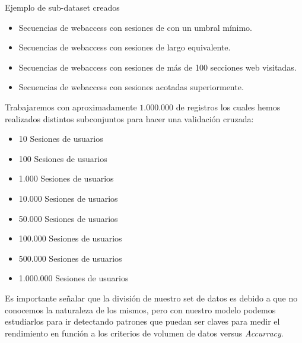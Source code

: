 Ejemplo de sub-dataset creados
\begin{itemize}
	\setlength{\itemsep}{0.9pt}
	\setlength{\parskip}{0pt}
	\setlength{\parsep}{0pt}
	\item Secuencias de webaccess con sesiones de con un umbral mínimo.
	\item Secuencias de webaccess con sesiones de largo equivalente.
	\item Secuencias de webaccess con sesiones de más de 100 secciones web visitadas.
	\item Secuencias de webaccess con sesiones acotadas superiormente.
\end{itemize}


Trabajaremos con aproximadamente $1.000.000$ de registros los cuales hemos realizados distintos subconjuntos para hacer una validación cruzada:

\begin{itemize}
	\setlength{\itemsep}{1pt}
	\setlength{\parskip}{0pt}
	\setlength{\parsep}{0pt}
	\item 10 Sesiones de usuarios
	\item 100 Sesiones de usuarios
	\item 1.000 Sesiones de usuarios
	\item 10.000 Sesiones de usuarios
	\item 50.000 Sesiones de usuarios
	\item 100.000 Sesiones de usuarios
	\item 500.000 Sesiones de usuarios
	\item 1.000.000 Sesiones de usuarios
\end{itemize}


Es importante señalar que la división de nuestro set de datos es debido a que no conocemos la naturaleza de los mismos, pero con nuestro modelo podemos estudiarlos para ir detectando patrones que puedan ser claves para medir el rendimiento en función a los criterios de volumen de datos versus \emph{Accurracy}.






